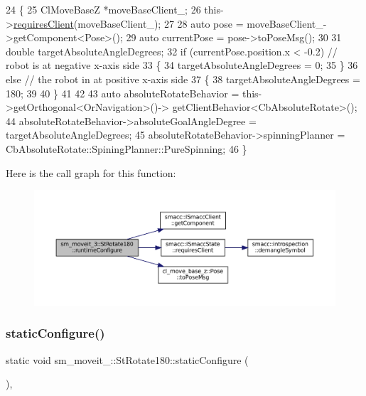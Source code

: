 \begin{DoxyCode}
24     \{
25         ClMoveBaseZ *moveBaseClient\_;
26         this->\hyperlink{classsmacc_1_1ISmaccState_a7f95c9f0a6ea2d6f18d1aec0519de4ac}{requiresClient}(moveBaseClient\_);
27 
28         \textcolor{keyword}{auto} pose = moveBaseClient\_->getComponent<Pose>();
29         \textcolor{keyword}{auto} currentPose = pose->toPoseMsg();
30 
31         \textcolor{keywordtype}{double} targetAbsoluteAngleDegrees;
32         \textcolor{keywordflow}{if} (currentPose.position.x < -0.2) \textcolor{comment}{// robot is at negative x-axis side}
33         \{
34                 targetAbsoluteAngleDegrees = 0;
35         \}
36         \textcolor{keywordflow}{else} \textcolor{comment}{// the robot in at positive x-axis side}
37         \{
38                 targetAbsoluteAngleDegrees = 180;
39              
40         \}
41 
42         
43         \textcolor{keyword}{auto} absoluteRotateBehavior = this->getOrthogonal<OrNavigation>()->
      getClientBehavior<CbAbsoluteRotate>();
44         absoluteRotateBehavior->absoluteGoalAngleDegree = targetAbsoluteAngleDegrees;
45         absoluteRotateBehavior->spinningPlanner = CbAbsoluteRotate::SpiningPlanner::PureSpinning;
46     \}
\end{DoxyCode}
Here is the call graph for this function\+:
\nopagebreak
\begin{figure}[H]
\begin{center}
\leavevmode
\includegraphics[width=350pt]{structsm__moveit__3_1_1StRotate180_a9669445b3273306a66e49d720336bfbf_cgraph}
\end{center}
\end{figure}
\mbox{\label{structsm__moveit__3_1_1StRotate180_ac00fb957306237c98b1f6f1b5d43aa50}} 
\subsubsection{\texorpdfstring{static\+Configure()}{staticConfigure()}}
{\footnotesize\ttfamily static void sm\+\_\+moveit\+\_\+::\+St\+Rotate180\+::static\+Configure (\begin{DoxyParamCaption}{ }\end{DoxyParamCaption})\hspace{0.3cm}{\ttfamily [inline]}, {\ttfamily [static]}}



